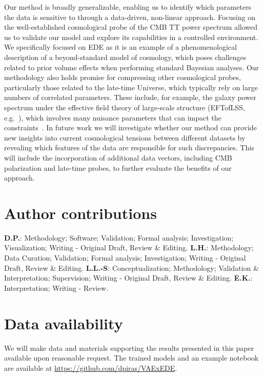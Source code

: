 \documentclass[aps, prd, reprint, superscriptaddress, nofootinbib, bibnotes]{revtex4-2}
\begin{document}
Our method is broadly generalizable, enabling us to identify which parameters the data is sensitive to through a data-driven, non-linear approach. Focusing on the \mbox{well-established} cosmological probe of the CMB TT power spectrum allowed us to validate our model and explore its capabilities in a controlled environment. We specifically focused on EDE as it is an example of a phenomenological description of a beyond-standard model of cosmology, which poses challenges related to prior volume effects when performing standard Bayesian analyses. Our methodology also holds promise for compressing other cosmological probes, particularly those related to the late-time Universe, which typically rely on large numbers of correlated parameters. These include, for example, the galaxy power spectrum under the effective field theory of large-scale structure (EFTofLSS, e.g.\ \cite{Baumann:2010tm,Carrasco:2012cv,Senatore:2014via,Senatore:2014eva}), which involves many nuisance parameters that can impact the constraints~\cite{Simon:2022lde, Maus:2023rtr, Holm:2023laa, Donald-McCann:2023kpx}. 
In future work we will investigate whether our method can provide new insights into current cosmological tensions between different datasets by revealing which features of the data are responsible for such discrepancies. This will include the incorporation of additional data vectors, including CMB polarization and late-time probes, to further evaluate the benefits of our approach. 


\section*{Author contributions}
\textbf{D.P.}: Methodology; Software; Validation; Formal analysis; Investigation; Visualization; Writing - Original Draft, Review \& Editing.
\textbf{L.H.}: Methodology; Data Curation; Validation; Formal analysis; Investigation; Writing - Original Draft, Review \& Editing.
\textbf{L.L.-S}: Conceptualization; Methodology; Validation \& Interpretation; Supervision; Writing - Original Draft, Review \& Editing.
\textbf{E.K.}: Interpretation; Writing - Review.


\section*{Data availability}
We will make data and materials supporting the results presented in this paper available upon reasonable request. The trained models and an example notebook are available at \href{https://github.com/dpiras/VAExEDE}{https://github.com/dpiras/VAExEDE}.
\end{document}
